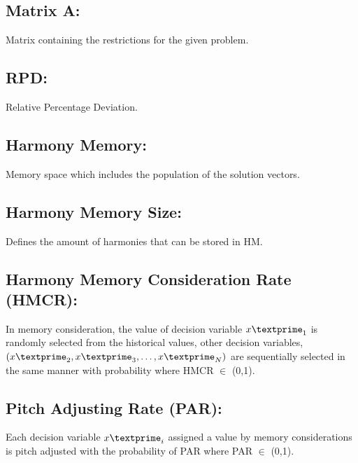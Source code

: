 \subsection{Matrix A:} Matrix containing the restrictions for the given problem.

\subsection{RPD:} Relative Percentage Deviation.

\subsection{Harmony Memory:} Memory space which includes the population of the solution vectors.

\subsection{Harmony Memory Size:} Defines the amount of harmonies that can be stored in HM.

\subsection{Harmony Memory Consideration Rate (HMCR):} In memory consideration, the value of decision variable ${x\textprime}_1$ is randomly selected from the historical values, other decision variables, $({x\textprime}_2, {x\textprime}_3,\dots,{x\textprime}_N)$ are sequentially selected in the same manner with probability where HMCR $\in$ (0,1).

\subsection{Pitch Adjusting Rate (PAR):} Each decision variable ${x\textprime}_i$ assigned a value by memory considerations is pitch adjusted with the probability of PAR where PAR $\in$ (0,1).



